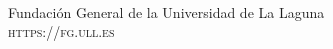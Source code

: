 \documentclass[12pt,fleqn]{book}
\begin{document}

\newpage
~\vfill
\thispagestyle{empty}

\noindent Fundación General de la Universidad de La Laguna\\ %


\noindent \textsc{https://fg.ull.es}\\ %






\pagestyle{empty} %

\tableofcontents %

\cleardoublepage %

\pagestyle{fancy} %

\end{document}
